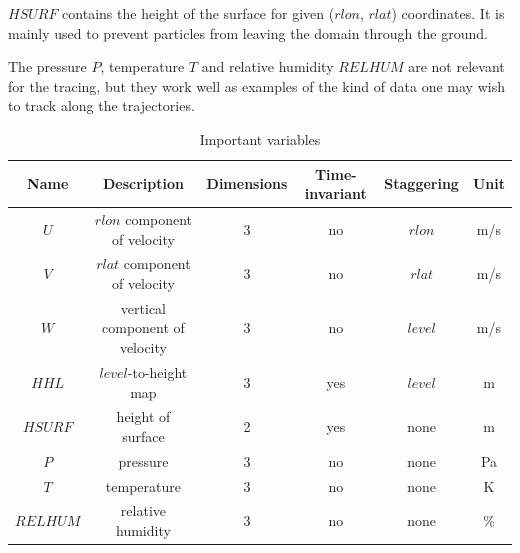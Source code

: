 $HSURF$ contains the height of the surface for given ($rlon$, $rlat$) coordinates. It is mainly used to prevent particles from leaving the domain through the ground.

The pressure $P$, temperature $T$ and relative humidity $RELHUM$ are not relevant for the tracing, but they work well as examples of the kind of data one may wish to track along the trajectories.

\begin{table}
\centering
\begin{tabular}{|c|c|c|c|c|c|}
\hline
Name & Description & Dimensions & Time-invariant & Staggering & Unit \\ \hline
$U$ & $rlon$ component of velocity & 3 & no & $rlon$ & m/s \\ \hline
$V$ & $rlat$ component of velocity & 3 & no & $rlat$ & m/s \\ \hline
$W$ & vertical component of velocity & 3 & no & $level$ & m/s \\ \hline
$HHL$ & $level$-to-height map & 3 & yes & $level$ & m \\ \hline
$HSURF$ & height of surface & 2 & yes & none & m \\ \hline
$P$ & pressure & 3 & no & none & Pa \\ \hline
$T$ & temperature & 3 & no & none & K \\ \hline
$RELHUM$ & relative humidity & 3 & no & none & \% \\ \hline
\end{tabular}
\caption{Important variables}
\label{tab:variables}
\end{table}

